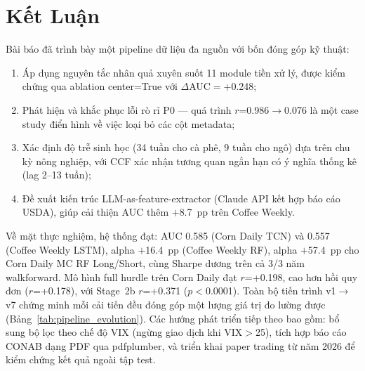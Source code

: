 \documentclass[conference]{IEEEtran}
\begin{document}
\section{Kết Luận}
Bài báo đã trình bày một pipeline dữ liệu đa nguồn với bốn đóng góp kỹ thuật:
\begin{enumerate}
\item Áp dụng nguyên tắc nhân quả xuyên suốt 11 module tiền xử lý, được kiểm
  chứng qua ablation center=True với $\Delta$AUC$=$+0.248;
\item Phát hiện và khắc phục lỗi rò rỉ P0 --- quá trình $r$=0.986$\to$0.076 là
  một case study điển hình về việc loại bỏ các cột metadata;
\item Xác định độ trễ sinh học (34 tuần cho cà phê, 9 tuần cho ngô) dựa trên
  chu kỳ nông nghiệp, với CCF xác nhận tương quan ngắn hạn có ý nghĩa thống kê
  (lag 2--13 tuần);
\item Đề xuất kiến trúc LLM-as-feature-extractor (Claude API kết hợp báo cáo
  USDA), giúp cải thiện AUC thêm $+$8.7~pp trên Coffee Weekly.
\end{enumerate}
Về mặt thực nghiệm, hệ thống đạt: AUC 0.585 (Corn Daily TCN) và 0.557 (Coffee
Weekly LSTM), alpha $+$16.4~pp (Coffee Weekly RF), alpha $+$57.4~pp cho Corn
Daily MC RF Long/Short, cùng Sharpe dương trên cả 3/3 năm walkforward. Mô hình
full hurdle trên Corn Daily đạt $r$=+0.198, cao hơn hồi quy đơn ($r$=+0.178),
với Stage~2b $r$=+0.371 ($p<$0.0001). Toàn bộ tiến trình v1$\to$v7 chứng minh
mỗi cải tiến đều đóng góp một lượng giá trị đo lường được
(Bảng~\ref{tab:pipeline_evolution}).
Các hướng phát triển tiếp theo bao gồm: bổ sung bộ lọc theo chế độ VIX (ngừng
giao dịch khi VIX$>$25), tích hợp báo cáo CONAB dạng PDF qua pdfplumber, và
triển khai paper trading từ năm 2026 để kiểm chứng kết quả ngoài tập test.
\end{document}
